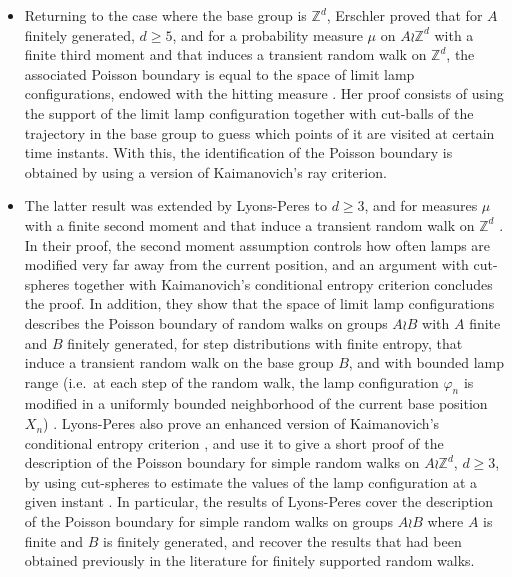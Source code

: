 \documentclass[reqno,oneside,11pt]{amsart}
\newcommand{\Z}{\mathbb{Z}}
\theoremstyle{plain}
\theoremstyle{definition}
\begin{document}
\begin{itemize}[--]
	\item Returning to the case where the base group is $\Z^d$, Erschler proved that for $A$ finitely generated, $d\ge 5$, and for a probability measure $\mu$ on $A\wr \Z^d$ with a finite third moment and that induces a transient random walk on $\Z^d$, the associated Poisson boundary is equal to the space of limit lamp configurations, endowed with the hitting measure \cite[Theorem 1]{Erschler2011}. Her proof consists of using the support of the limit lamp configuration together with cut-balls of the trajectory in the base group to guess which points of it are visited at certain time instants. With this, the identification of the Poisson boundary is obtained by using a version of Kaimanovich's ray criterion.
	\item The latter result was extended by Lyons-Peres to $d\ge 3$, and for measures $\mu$ with a finite second moment and that induce a transient random walk on $\Z^d$ \cite[Theorem 5.1]{LyonsPeres2021}. In their proof, the second moment assumption controls how often lamps are modified very far away from the current position, and an argument with cut-spheres together with Kaimanovich's conditional entropy criterion concludes the proof. In addition, they show that the space of limit lamp configurations describes the Poisson boundary of random walks on groups $A\wr B$ with $A$ finite and $B$ finitely generated, for step distributions with finite entropy, that induce a transient random walk on the base group $B$, and with bounded lamp range (i.e.\ at each step of the random walk, the lamp configuration $\varphi_n$ is modified in a uniformly bounded neighborhood of the current base position $X_n$) \cite[Theorem 1.1]{LyonsPeres2021}. Lyons-Peres also prove an enhanced version of Kaimanovich's conditional entropy criterion \cite[Corollary 2.3]{LyonsPeres2021}, and use it to give a short proof of the description of the Poisson boundary for simple random walks on $A\wr \Z^d$, $d\ge 3$, by using cut-spheres to estimate the values of the lamp configuration at a given instant \cite[Theorem 3.1]{LyonsPeres2021}. In particular, the results of Lyons-Peres cover the description of the Poisson boundary for simple random walks on groups $A\wr B$ where $A$ is finite and $B$ is finitely generated, and recover the results that had been obtained previously in the literature for finitely supported random walks.
\end{itemize}
\end{document}
